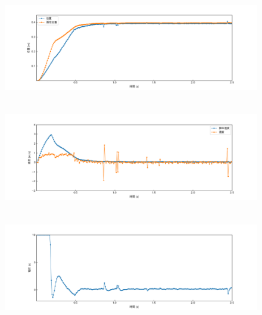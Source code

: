 \documentclass[12pt]{jsarticle}
\begin{document}
\begin{figure}[H]
  \begin{center}
    \includegraphics[clip,width=13.0cm, height=4.4cm]{../img/Exp2-1.png}
    \caption{}
    \label{Exp2-1}
  \end{center}
\end{figure}
\begin{figure}[H]
  \begin{center}
    \includegraphics[clip,width=13.0cm, height=4.4cm]{../img/Exp2-2.png}
    \caption{}
    \label{Exp2-2}
  \end{center}
\end{figure}
\begin{figure}[H]
  \begin{center}
    \includegraphics[clip,width=13.0cm, height=4.4cm]{../img/Exp2-3.png}
    \caption{}
    \label{Exp2-3}
  \end{center}
\end{figure}
\end{document}
